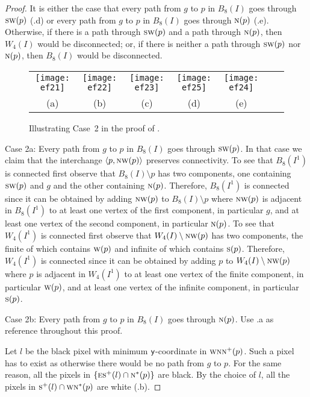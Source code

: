 \documentclass[lotsofwhite,charterfonts]{patmorin}
\newcommand{\N}{\textsc{n}}
\newcommand{\E}{\textsc{e}}
\renewcommand{\S}{\textsc{s}}
\newcommand{\SW}{\textsc{sw}}
\newcommand{\W}{\textsc{w}}
\newcommand{\NW}{\textsc{nw}}
\newcommand{\y}{\ensuremath{\protect\textup{\textsf{y}}}}
\newcommand{\ic}[2]{\langle #1,#2 \rangle}
\newcommand{\sm}{\ensuremath{\setminus}}
\begin{document}
\begin{proof}
It is either the case that every path from $g$ to $p$ in $B_8(I)$ goes
through  $\SW(p)$ (.d) or every path from $g$ to $p$ in
$B_8(I)$ goes through $\N(p)$ (.e). Otherwise,
if there is a path through $\SW(p)$ and a path through $\N(p)$, then
$W_4(I)$ would be disconnected; or, if there is neither a path through
$\SW(p)$ nor $\N(p)$, then $B_8(I)$ would be disconnected.


\begin{figure}[htbp]
\begin{center}
\begin{tabular}{ccccccc}
\texttt{[image: ef21]} & 
\texttt{[image: ef22]} & 
\texttt{[image: ef23]} & 
\texttt{[image: ef25]} & 
\texttt{[image: ef24]} 
\\
(a) & (b) & (c) & (d) & (e)
\end{tabular}
\end{center}
\caption{Illustrating Case~2 in the proof of .}
\end{figure}


\noindent Case 2a: Every path from $g$ to $p$ in $B_8(I)$ goes through $\SW(p)$.  In that case we claim that the interchange $\ic{p}{\NW(p)}$ preserves connectivity. To see that $B_8(I^1)$ is connected first observe that $B_8(I)\sm p$ has two components, one containing $\SW(p)$ and $g$ and the other containing $\N(p)$. Therefore, $B_8(I^1)$ is connected since it can be obtained by adding $\NW(p)$ to $B_8(I)\sm p$ where $\NW(p)$ is adjacent in $B_8(I^1)$ to at least one vertex of the first component, in particular $g$, and at least one vertex of the second component, in particular $\N(p)$. To see that $W_4(I^1)$ is connected first observe that $W_4(I)\sm \NW(p)$ has two components, the finite of which contains $\W(p)$ and infinite of which contains $\S(p)$. Therefore, $W_4(I^1)$ is connected since it can be obtained by adding $p$ to $W_4(I)\sm \NW(p)$ where $p$ is adjacent in $W_4(I^1)$ to at least one vertex of the finite component, in particular $\W(p)$, and at least one vertex of the infinite component, in particular $\S(p)$.



\noindent Case 2b: Every path from $g$ to $p$ in $B_8(I)$ goes through $\N(p)$. Use .a as reference throughout this proof. 

Let $l$ be the black pixel with minimum \y-coordinate in $\W\N\N^+(p)$. Such a pixel has to exist as otherwise there would be no path from $g$ to $p$. For the same reason, all the pixels in $\{\E\S^+(l) \cap \N^*(p)\}$ are black. By the choice of $l$, all the pixels in $\S^+(l) \cap \W\N^*(p)$ are white (.b). 


\end{proof}
\end{document}
